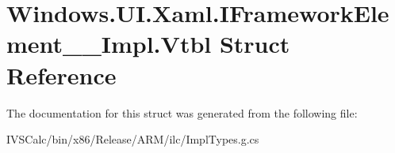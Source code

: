 \hypertarget{struct_windows_1_1_u_i_1_1_xaml_1_1_i_framework_element_____impl_1_1_vtbl}{}\section{Windows.\+U\+I.\+Xaml.\+I\+Framework\+Element\+\_\+\+\_\+\+Impl.\+Vtbl Struct Reference}
\label{struct_windows_1_1_u_i_1_1_xaml_1_1_i_framework_element_____impl_1_1_vtbl}


The documentation for this struct was generated from the following file\+:\begin{DoxyCompactItemize}
\item 
I\+V\+S\+Calc/bin/x86/\+Release/\+A\+R\+M/ilc/Impl\+Types.\+g.\+cs\end{DoxyCompactItemize}
